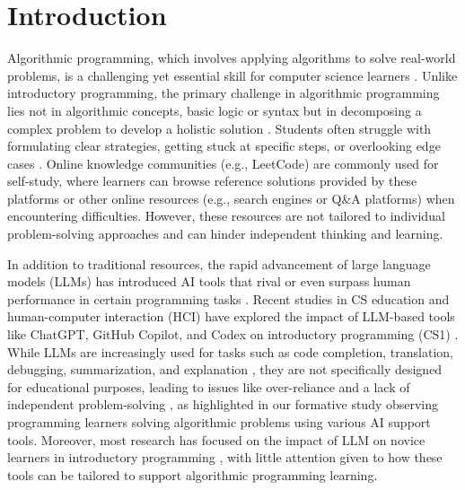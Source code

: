 \section{Introduction}


Algorithmic programming, which involves applying algorithms to solve real-world problems, is a challenging yet essential skill for computer science learners \cite{backhouse2011algorithmic, skiena1998algorithm}. Unlike introductory programming, the primary challenge in algorithmic programming lies not in algorithmic concepts, basic logic or syntax but in decomposing a complex problem to develop a holistic solution \cite{smetsers2017problem, backhouse2011algorithmic}. Students often struggle with formulating clear strategies, getting stuck at specific steps, or overlooking edge cases \cite{linn1985cognitive, piech2015autonomously}. Online knowledge communities (e.g., LeetCode) are commonly used for self-study, where learners can browse reference solutions provided by these platforms or other online resources (e.g., search engines or Q\&A platforms) when encountering difficulties. However, these resources are not tailored to individual problem-solving approaches and can hinder independent thinking and learning.

In addition to traditional resources, the rapid advancement of large language models (LLMs) has introduced AI tools that rival or even surpass human performance in certain programming tasks \cite{finnie2023my}. Recent studies in CS education and human-computer interaction (HCI) have explored the impact of LLM-based tools like ChatGPT, GitHub Copilot, and Codex on introductory programming (CS1) \cite{kazemitabaar2023studying, jin2024teach, finnie2022robots, roest2024next}. While LLMs are increasingly used for tasks such as code completion, translation, debugging, summarization, and explanation \cite{hou2024large, sarsa2022automatic}, they are not specifically designed for educational purposes, leading to issues like over-reliance and a lack of independent problem-solving \cite{kazemitabaar2023novices, sheese2024patterns}, as highlighted in our formative study observing programming learners solving algorithmic problems using various AI support tools. Moreover, most research has focused on the impact of LLM on novice learners in introductory programming \cite{kazemitabaar2023studying, jin2024teach, finnie2022robots, roest2024next}, with little attention given to how these tools can be tailored to support algorithmic programming learning. 

